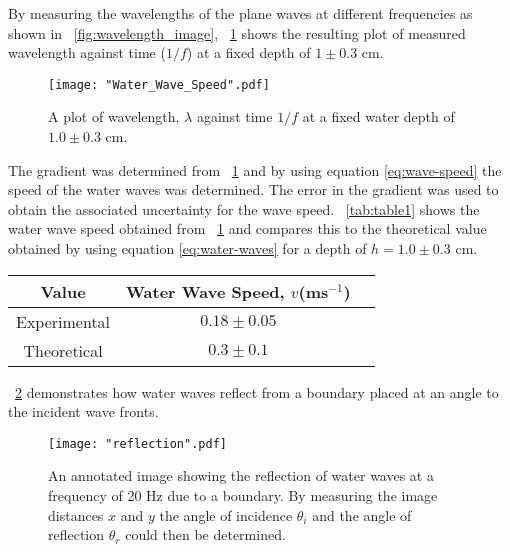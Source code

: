 \documentclass{article}
\newcommand{\figref}[2][\figurename~]{#1\ref{#2}}
\newcommand{\tabref}[2][\tablename~]{#1\ref{#2}}
\begin{document}
\newpage
\vspace{2mm}
\noindent
By measuring the wavelengths of the plane waves at different frequencies as shown in \figref{fig:wavelength_image}, \figref{fig:speed_graph} shows the resulting plot of measured wavelength against time ($1/f$) at a fixed depth of $1 \pm 0.3$ cm. 

\begin{figure}[h]
\centering
\texttt{[image: "Water\_Wave\_Speed".pdf]}
\caption{A plot of wavelength, $\lambda$ against time $1/f$ at a fixed water depth of $1.0 \pm 0.3$ cm.}
\label{fig:speed_graph}
\end{figure}

\vspace{2mm}
\noindent
The gradient was determined from \figref{fig:speed_graph} and by using equation \eqref{eq:wave-speed} the speed of the water waves was determined. The error in the gradient was used to obtain the associated uncertainty for the wave speed. \tabref{tab:table1} shows the water wave speed obtained from \figref{fig:speed_graph} and compares this to the theoretical value obtained by using equation \eqref{eq:water-waves} for a depth of $h = 1.0 \pm 0.3$ cm.

\vspace{5mm}
\begin{table*}[h]
\centering %
\caption{Table of values for the speed of water waves at a fixed depth of $h = 1.0 \pm 0.3$ cm and varying frequency.}
\label{tab:table1}
\begin{tabular}{|c|c|c|}
\hline
Value & Water Wave Speed, $v$(ms$^{-1}$) \\
\hline
Experimental & $0.18 \pm 0.05$ \\
\hline
Theoretical & $0.3 \pm 0.1$ \\
\hline
\end{tabular}
\end{table*}

\newpage
\vspace{2mm}
\noindent
\figref{fig:reflection_image} demonstrates how water waves reflect from a boundary placed at an angle to the incident wave fronts.

\begin{figure}[h]
\centering
\texttt{[image: "reflection".pdf]}
\caption{An annotated image showing the reflection of water waves at a frequency of 20 Hz due to a boundary. By measuring the image distances $x$ and $y$ the angle of incidence $\theta_i$ and the angle of reflection $\theta_r$ could then be determined.}
\label{fig:reflection_image}
\end{figure}
\end{document}
